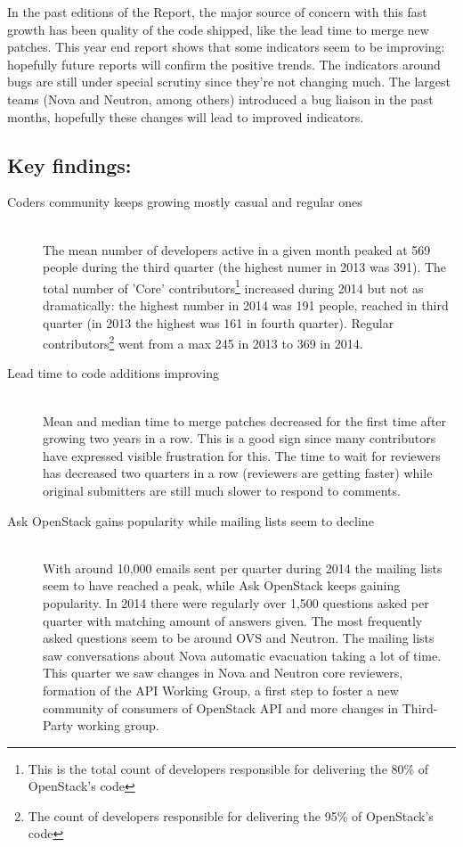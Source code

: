 \documentclass[a4wide,11pt]{report}
\begin{document}
In the past editions of the Report, the major source of concern with this fast growth has been quality of the code shipped, like the lead time to merge new patches. This year end report shows that some indicators seem to be improving: hopefully future reports will confirm the positive trends.  The indicators around bugs are still under special scrutiny since they're not changing much. The largest teams (Nova and Neutron, among others) introduced a bug liaison in the past months, hopefully these changes will lead to improved indicators.

\subsection*{Key findings:}
\begin{description}

\item[Coders community keeps growing mostly casual and regular ones] \hfill \\ 
The mean number of developers active in a given month peaked at 569 people during the third quarter (the highest numer in 2013 was 391). The total number of 'Core' contributors\footnote{This is the total count of developers responsible for delivering the 80\% of OpenStack's code} increased during 2014 but not as dramatically: the highest number in 2014 was 191 people, reached in third quarter (in 2013 the highest was 161 in fourth quarter).  Regular contributors\footnote{The count of developers responsible for delivering the 95\% of OpenStack's code} went from a max 245 in 2013 to 369 in 2014.

\item[Lead time to code additions improving] \hfill \\
Mean and median time to merge patches decreased for the first time after growing two years in a row. This is a good sign since many contributors have expressed visible frustration for this.  The time to wait for reviewers has decreased two quarters in a row (reviewers are getting faster) while original submitters are still much slower to respond to comments.

\item[Ask OpenStack gains popularity while mailing lists seem to decline] \hfill \\
With around 10,000 emails sent per quarter during 2014 the mailing lists seem to have reached a peak, while Ask OpenStack keeps gaining popularity. In 2014 there were regularly over 1,500 questions asked per quarter with matching amount of answers given.  The most frequently asked questions seem to be around OVS and Neutron. The mailing lists saw conversations about Nova automatic evacuation taking a lot of time. This quarter we saw changes in Nova and Neutron core reviewers, formation of the API Working Group, a first step to foster a new community of consumers of OpenStack API and more changes in Third-Party working group.

\end{description}
\end{document}
